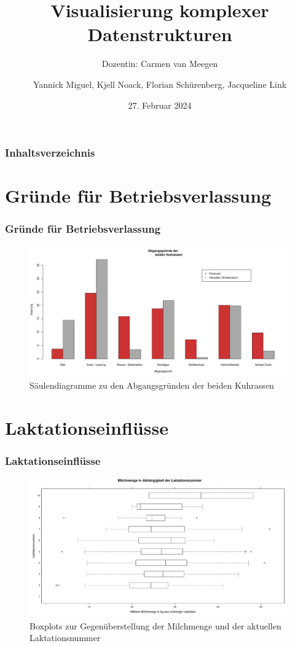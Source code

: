 \documentclass{beamer}
\title[]{Visualisierung komplexer Datenstrukturen}
\subtitle{Dozentin: Carmen van Meegen}
\author[]{Yannick Miguel, Kjell Noack, Florian Schürenberg, Jacqueline Link}
\date[27.02.2024]{27. Februar 2024}
\begin{document}
 
	\begin{frame}
		\maketitle
	\end{frame}        
	\begin{frame}
		\frametitle{Inhaltsverzeichnis}
		\tableofcontents
	\end{frame}
	\addtocounter{framenumber}{-1}
	\section{Gründe für Betriebsverlassung}
	\begin{frame}
		\frametitle{Gründe für Betriebsverlassung}
		\begin{figure}[htbp]
			\centering
			\includegraphics[scale = 0.32]{abgang.pdf}
			\caption{Säulendiagramme zu den Abgangsgründen der beiden Kuhrassen}
		\end{figure}
	\end{frame}
	
	\section{Laktationseinflüsse}
	\begin{frame}
		\frametitle{Laktationseinflüsse}
		\begin{figure}[htbp]
			\centering
			\includegraphics[scale = 0.333]{lattice.pdf}
			\vspace{-0.6cm}
			\caption{Boxplots zur Gegenüberstellung der Milchmenge und der aktuellen Laktationsnummer}
		\end{figure}
	\end{frame}
\end{document}
